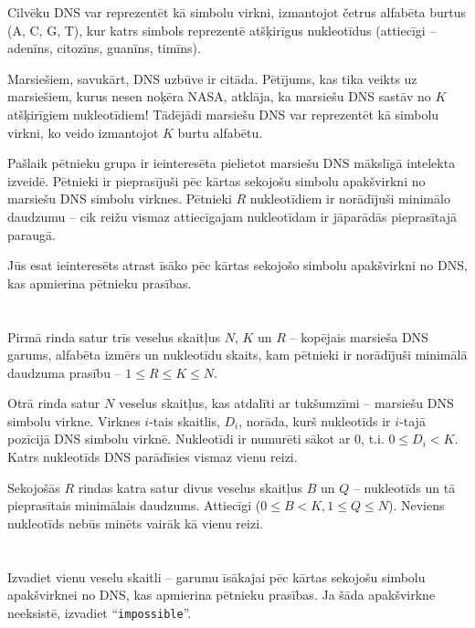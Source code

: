 \ifx\boi\undefined\fi
\def\version{jury-1}
Cilvēku DNS var reprezentēt kā simbolu virkni,
izmantojot četrus alfabēta burtus ({A, C, G, T}), kur katrs simbols reprezentē
atšķirīgus nukleotīdus (attiecīgi -- adenīns, citozīns, guanīns, timīns).

Marsiešiem, savukārt, DNS uzbūve ir citāda. Pētījums, kas tika veikts
uz marsiešiem, kurus nesen noķēra NASA, atklāja, ka marsiešu DNS sastāv no
$K$ atšķirīgiem nukleotīdiem! Tādējādi marsiešu DNS var reprezentēt kā
simbolu virkni, ko veido izmantojot $K$ burtu alfabētu.

Pašlaik pētnieku grupa ir ieinteresēta pielietot marsiešu DNS
mākslīgā intelekta izveidē. Pētnieki ir pieprasījuši pēc kārtas sekojošu simbolu
apakšvirkni no marsiešu DNS simbolu virknes. Pētnieki $R$ nukleotīdiem ir norādījuši
minimālo daudzumu -- cik reižu vismaz attiecīgajam nukleotīdam ir jāparādās
pieprasītajā paraugā.

Jūs esat ieinteresēts atrast īsāko pēc kārtas sekojošo simbolu apakšvirkni no DNS, kas apmierina pētnieku prasības.

\section*{}
Pirmā rinda satur trīs veselus skaitļus $N$, $K$ un $R$ --
kopējais marsieša DNS garums, alfabēta izmērs un
nukleotīdu skaits, kam pētnieki ir norādījuši minimālā daudzuma
prasību -- $1 \le R \le K \le N$.

Otrā rinda satur $N$ veselus skaitļus, kas atdalīti ar tukšumzīmi -- marsiešu
DNS simbolu virkne. Virknes $i$-tais skaitlis, $D_i$, norāda, kurš nukleotīds
ir $i$-tajā pozīcijā DNS simbolu virknē. Nukleotīdi ir numurēti sākot ar $0$, t.i.
$0 \leq D_i < K$. Katrs nukleotīds DNS parādīsies vismaz vienu reizi.

Sekojošās $R$ rindas katra satur divus veselus skaitļus $B$ un $Q$ --
nukleotīds un tā pieprasītais minimālais daudzums. Attiecīgi ($0 \le B < K, 1 \le Q \le N$).
Neviens nukleotīds nebūs minēts vairāk kā vienu reizi.

\section*{\outputsection}
Izvadiet vienu veselu skaitli -- garumu īsākajai pēc kārtas sekojošu simbolu apakšvirknei
no DNS, kas apmierina pētnieku prasības. Ja šāda apakšvirkne
neeksistē, izvadiet ``\texttt{impossible}''.

